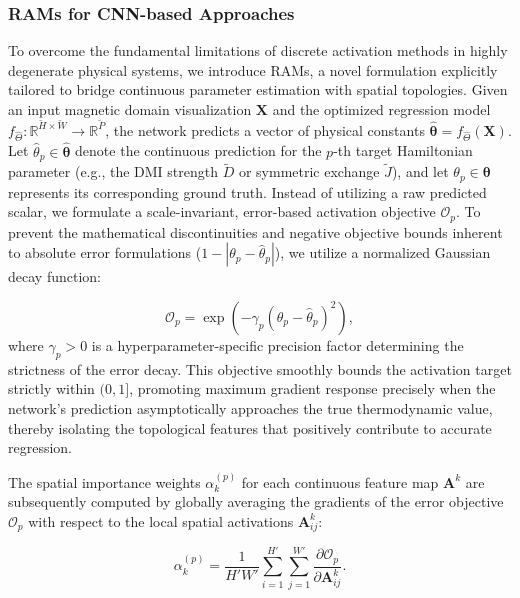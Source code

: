 \documentclass[final,5p,times,twocolumn]{elsarticle}
\begin{document}
\subsubsection{RAMs for CNN-based Approaches}\label{sec:CNN_RAMs}

To overcome the fundamental limitations of discrete activation methods in highly degenerate physical systems, we introduce RAMs, a novel formulation explicitly tailored to bridge continuous parameter estimation with spatial topologies. Given an input magnetic domain visualization $\mathbf{X}$ and the optimized regression model $f_{\hat{\Theta}} : \mathbb{R}^{\breve{H} \times \breve{W}} \rightarrow \mathbb{R}^{\breve{P}}$, the network predicts a vector of physical constants $\hat{\boldsymbol{\theta}} = f_{\hat{\Theta}}(\mathbf{X})$. Let $\hat{\theta}_p \in \hat{\boldsymbol{\theta}}$ denote the continuous prediction for the $p$-th target Hamiltonian parameter (e.g., the DMI strength $\tilde{D}$ or symmetric exchange $\tilde{J}$), and let $\theta_p \in \boldsymbol{\theta}$ represents its corresponding ground truth. Instead of utilizing a raw predicted scalar, we formulate a scale-invariant, error-based activation objective $\mathcal{O}_p$. To prevent the mathematical discontinuities and negative objective bounds inherent to absolute error formulations ($1 - |\theta_p - \hat{\theta}_p|$), we utilize a normalized Gaussian decay function:

\begin{equation}\label{eq:RAM_Objective}
\mathcal{O}_p = \exp\left(-\gamma_p \left(\theta_p - \hat{\theta}_p\right)^2\right),
\end{equation}
where $\gamma_p>0$ is a hyperparameter-specific precision factor determining the strictness of the error decay. This objective smoothly bounds the activation target strictly within $(0, 1]$, promoting maximum gradient response precisely when the network's prediction asymptotically approaches the true thermodynamic value, thereby isolating the topological features that positively contribute to accurate regression.

The spatial importance weights $\alpha_k^{(p)}$ for each continuous feature map $\mathbf{A}^k$ are subsequently computed by globally averaging the gradients of the error objective $\mathcal{O}_p$ with respect to the local spatial activations $\mathbf{A}_{ij}^k$:

\begin{equation}\label{eq:RAM_Weights}
\alpha_k^{(p)} = \frac{1}{H' W'} \sum_{i=1}^{H'} \sum_{j=1}^{W'} \frac{\partial \mathcal{O}_p}{\partial \mathbf{A}_{ij}^k}.
\end{equation}
\end{document}
